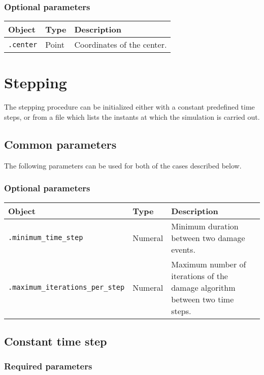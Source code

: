 \documentclass[10pt]{article}
\begin{document}
\subsubsection*{Optional parameters}

\begin{tabularx}{\textwidth}{llX}
\hline 
Object & Type & Description \\ 
\hline 
\verb+.center+ & Point & Coordinates of the center. \\ 
\hline 
\end{tabularx} 

\section{Stepping}

The stepping procedure can be initialized either with a constant predefined time steps, or from a file which lists the instants at which the simulation is carried out.

\subsection{Common parameters}

The following parameters can be used for both of the cases described below.

\subsubsection*{Optional parameters}

\begin{tabularx}{\textwidth}{llX}
\hline 
Object & Type & Description \\ 
\hline 
\verb+.minimum_time_step+ & Numeral & Minimum duration between two damage events. \\ 
\verb+.maximum_iterations_per_step+ & Numeral & Maximum number of iterations of the damage algorithm between two time steps.\\
\hline 
\end{tabularx}

\subsection{Constant time step}

\subsubsection*{Required parameters}
\end{document}
